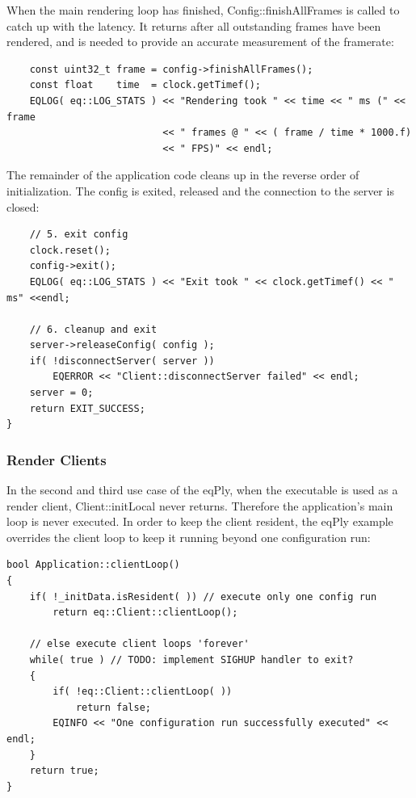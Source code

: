 \documentclass[10pt,a4]{scrartcl}
\begin{document}
When the main rendering loop has finished,
\textsf{Config::finishAllFrames} is called to catch up with the
latency. It returns after all outstanding frames have been rendered, and
is needed to provide an accurate measurement of the framerate:

{\footnotesize\begin{lstlisting}
    const uint32_t frame = config->finishAllFrames();
    const float    time  = clock.getTimef();
    EQLOG( eq::LOG_STATS ) << "Rendering took " << time << " ms (" << frame
                           << " frames @ " << ( frame / time * 1000.f)
                           << " FPS)" << endl;
\end{lstlisting}}%

The remainder of the application code cleans up in the reverse order of
initialization. The config is exited, released and the connection to
the server is closed:

{\footnotesize\begin{lstlisting}
    // 5. exit config
    clock.reset();
    config->exit();
    EQLOG( eq::LOG_STATS ) << "Exit took " << clock.getTimef() << " ms" <<endl;

    // 6. cleanup and exit
    server->releaseConfig( config );
    if( !disconnectServer( server ))
        EQERROR << "Client::disconnectServer failed" << endl;
    server = 0;
    return EXIT_SUCCESS;
}
\end{lstlisting}}%

\subsubsection{Render Clients}

In the second and third use case of the \textsf{eqPly}, when the
executable is used as a render client, \textsf{Client::initLocal} never
returns. Therefore the application's main loop is never executed. In
order to keep the client resident, the \textsf{eqPly} example overrides
the client loop to keep it running beyond one configuration run:

{\footnotesize\begin{lstlisting}
bool Application::clientLoop()
{
    if( !_initData.isResident( )) // execute only one config run
        return eq::Client::clientLoop();

    // else execute client loops 'forever'
    while( true ) // TODO: implement SIGHUP handler to exit?
    {
        if( !eq::Client::clientLoop( ))
            return false;
        EQINFO << "One configuration run successfully executed" << endl;
    }
    return true;
}
\end{lstlisting}}%
\end{document}
